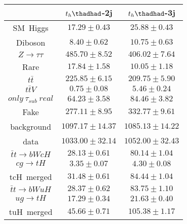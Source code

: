 \centering
\begin{tabular}{|c|c|c|} \hline
 & $t_{h}\thadhad$-2j                      & $t_{h}\thadhad$-3j \\\hline
SM~Higgs              & $17.29\pm0.43$                  & $25.88\pm0.43$     \\\hline
Diboson               & $8.40\pm0.62$                    & $10.75\pm0.63$     \\\hline
$Z\to\tau\tau$        & $485.70\pm8.52$           & $406.02\pm7.64$    \\\hline
Rare                  & $17.84\pm1.58$                      & $10.05\pm1.18$     \\\hline
$t\bar{t}$            & $225.85\pm6.15$               & $209.75\pm5.90$    \\\hline
$t\bar{t}V$           & $0.75\pm0.08$                & $5.46\pm0.24$      \\\hline
$only~\tau_{sub}~real$& $64.23\pm3.58$    & $84.46\pm3.82$     \\\hline
Fake                  & $277.11\pm8.95$                     & $332.77\pm9.61$    \\\hline
background            & $1097.17\pm14.37$             & $1085.13\pm14.22$  \\\hline
data                  & $1033.00\pm32.14$                   & $1052.00\pm32.43$  \\\hline
$\bar{t}t\to bWcH$    & $28.13\pm0.61$        & $80.14\pm1.04$     \\\hline
$cg\to tH$            & $3.35\pm0.07$                 & $4.30\pm0.08$      \\\hline
tcH~merged            & $31.48\pm0.61$                & $84.44\pm1.04$     \\\hline
$\bar{t}t\to bWuH$    & $28.37\pm0.62$        & $83.75\pm1.10$     \\\hline
$ug\to tH$            & $17.29\pm0.34$                & $21.63\pm0.40$     \\\hline
tuH~merged            & $45.66\pm0.71$                & $105.38\pm1.17$    \\\hline
\end{tabular}